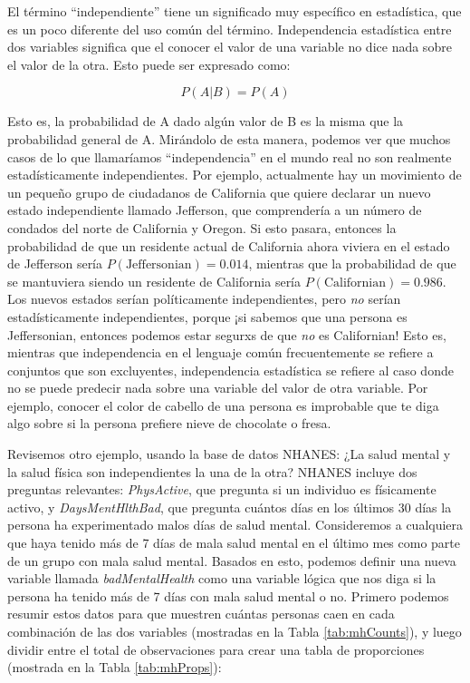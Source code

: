 \documentclass[
  12pt,
]{book}
\begin{document}
El término ``independiente'' tiene un significado muy específico en estadística, que es un poco diferente del uso común del término. Independencia estadística entre dos variables significa que el conocer el valor de una variable no dice nada sobre el valor de la otra. Esto puede ser expresado como:

\[
P(A|B) = P(A)
\]

Esto es, la probabilidad de A dado algún valor de B es la misma que la probabilidad general de A. Mirándolo de esta manera, podemos ver que muchos casos de lo que llamaríamos ``independencia'' en el mundo real no son realmente estadísticamente independientes. Por ejemplo, actualmente hay un movimiento de un pequeño grupo de ciudadanos de California que quiere declarar un nuevo estado independiente llamado Jefferson, que comprendería a un número de condados del norte de California y Oregon. Si esto pasara, entonces la probabilidad de que un residente actual de California ahora viviera en el estado de Jefferson sería \(P(\text{Jeffersonian})=0.014\), mientras que la probabilidad de que se mantuviera siendo un residente de California sería \(P(\text{Californian})=0.986\). Los nuevos estados serían políticamente independientes, pero \emph{no} serían estadísticamente independientes, porque ¡si sabemos que una persona es Jeffersonian, entonces podemos estar segurxs de que \emph{no} es Californian! Esto es, mientras que independencia en el lenguaje común frecuentemente se refiere a conjuntos que son excluyentes, independencia estadística se refiere al caso donde no se puede predecir nada sobre una variable del valor de otra variable. Por ejemplo, conocer el color de cabello de una persona es improbable que te diga algo sobre si la persona prefiere nieve de chocolate o fresa.

Revisemos otro ejemplo, usando la base de datos NHANES: ¿La salud mental y la salud física son independientes la una de la otra? NHANES incluye dos preguntas relevantes: \emph{PhysActive}, que pregunta si un individuo es físicamente activo, y \emph{DaysMentHlthBad}, que pregunta cuántos días en los últimos 30 días la persona ha experimentado malos días de salud mental. Consideremos a cualquiera que haya tenido más de 7 días de mala salud mental en el último mes como parte de un grupo con mala salud mental. Basados en esto, podemos definir una nueva variable llamada \emph{badMentalHealth} como una variable lógica que nos diga si la persona ha tenido más de 7 días con mala salud mental o no. Primero podemos resumir estos datos para que muestren cuántas personas caen en cada combinación de las dos variables (mostradas en la Tabla \ref{tab:mhCounts}), y luego dividir entre el total de observaciones para crear una tabla de proporciones (mostrada en la Tabla \ref{tab:mhProps}):
\end{document}
